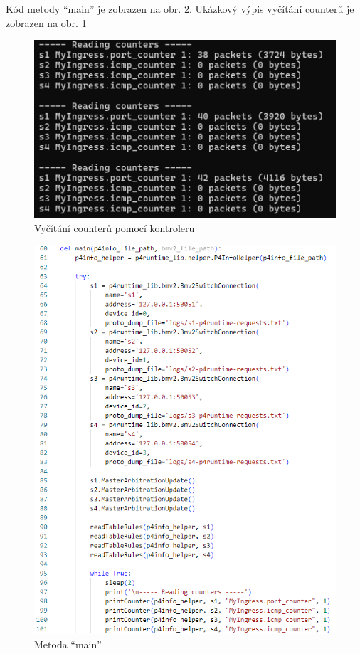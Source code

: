 \documentclass[czech, 11pt]{article}
\begin{document}
    Kód metody \enquote{main} je zobrazen na obr. \ref{main}. Ukázkový výpis vyčítání counterů je zobrazen na obr. \ref{controller_counter_read}
    \begin{figure}[H]
		\centering
		\includegraphics[width=.7\textwidth]{Figures/controller/vycitani_counteru_priklad.png}
		\caption{Vyčítání counterů pomocí kontroleru}
		\label{controller_counter_read}
	\end{figure}
    

    \begin{figure}[H]
		\centering
		\includegraphics[width=\textwidth]{Figures/controller/metoda_main.png}
		\caption{Metoda \enquote{main}}
		\label{main}
	\end{figure}
\end{document}
